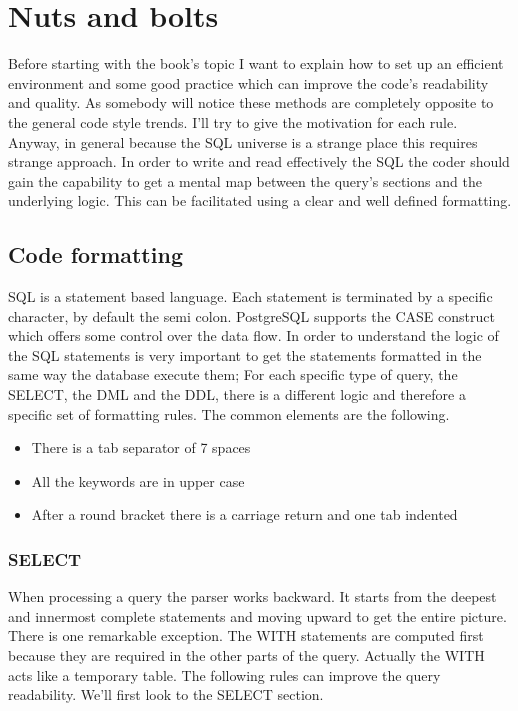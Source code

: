 \chapter{Nuts and bolts}
Before starting with the book's topic I want to explain how to set up an
efficient environment and some good practice which can improve the code's readability and quality.
As somebody will notice these methods are completely opposite to the general code style trends. I'll 
try to give the motivation for each rule. Anyway, in general because the SQL universe is a strange 
place this requires strange approach. In order to write and read effectively the SQL the coder should gain 
the capability to get a mental map  between the query's sections and the underlying logic. This can be 
facilitated using a clear and well defined formatting.\newline

\section{Code formatting}
SQL is a statement based language. Each statement is terminated by a specific character, by 
default the semi colon. PostgreSQL supports the CASE construct which offers some control over the data flow. In 
order to understand the logic of the SQL statements is very important to get the statements formatted in the same 
way the database execute them; For each specific type of query, the SELECT, the DML and the DDL, there is 
a different logic and therefore a specific set of formatting rules. The common elements are the following.

\begin{itemize}
 \item There is a tab separator of 7 spaces
 \item All the keywords are in upper case
 \item After a round bracket there is a carriage return and one tab indented 
\end{itemize}



\subsection{SELECT}
When processing a query the parser works backward. It starts from the deepest and innermost complete statements 
and moving upward to get the entire picture. There is one remarkable exception. The WITH statements are computed 
first because they are required in the other parts of the query. Actually the WITH acts like a temporary table. 
The following rules can improve the query readability. We'll first look to the SELECT section.

